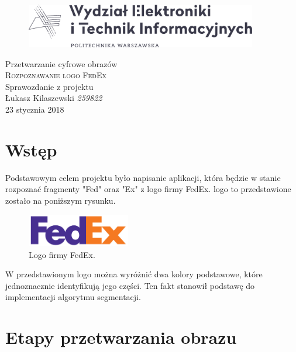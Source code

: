 \documentclass[12pt, oneside, final]{report}
\begin{document}
\begin{titlepage}
	\centering
	\begin{figure}
		\centering
		\includegraphics[width=0.9\textwidth]{logo.pdf}
	\end{figure}
	\vspace*{100pt}
	\LARGE{Przetwarzanie cyfrowe obrazów}\\
	\vspace{30pt}
	\textsc{\Huge{Rozpoznawanie logo FedEx}}\\
	\vspace{10pt}
	\large{Sprawozdanie z projektu}\\
	\vspace{120pt}
	\Large{Łukasz Kilaszewski \textit{259822}}\\
	\vfill
	\large{23 stycznia 2018}
\end{titlepage}

\thispagestyle{empty}

\section*{Wstęp}
Podstawowym celem projektu było napisanie aplikacji, która będzie w stanie rozpoznać fragmenty "Fed" oraz "Ex" z logo firmy FedEx. logo to przedstawione zostało na poniższym rysunku.
\begin{figure}[ht!]
	\centering
	\includegraphics[width=0.4\textwidth]{images/logo.jpg}
	\caption{Logo firmy FedEx.}
\end{figure}

W przedstawionym logo można wyróżnić dwa kolory podstawowe, które jednoznacznie identyfikują jego części. Ten fakt stanowił podstawę do implementacji algorytmu segmentacji.

\section*{Etapy przetwarzania obrazu}
\end{document}
